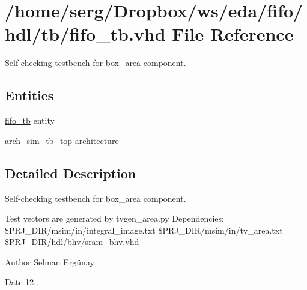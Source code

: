 \hypertarget{fifo__tb_8vhd}{}\section{/home/serg/\+Dropbox/ws/eda/fifo/hdl/tb/fifo\+\_\+tb.vhd File Reference}
\label{fifo__tb_8vhd}


Self-\/checking testbench for box\+\_\+area component.  


\subsection*{Entities}
\begin{DoxyCompactItemize}
\item 
\hyperlink{classfifo__tb}{fifo\+\_\+tb} entity
\item 
\hyperlink{classfifo__tb_1_1arch__sim__tb__top}{arch\+\_\+sim\+\_\+tb\+\_\+top} architecture
\end{DoxyCompactItemize}


\subsection{Detailed Description}
Self-\/checking testbench for box\+\_\+area component. 

Test vectors are generated by tvgen\+\_\+area.\+py Dependencies\+: \$\+P\+R\+J\+\_\+\+D\+IR/msim/in/integral\+\_\+image.txt \$\+P\+R\+J\+\_\+\+D\+IR/msim/in/tv\+\_\+area.txt \$\+P\+R\+J\+\_\+\+D\+IR/hdl/bhv/sram\+\_\+bhv.vhd \begin{DoxyAuthor}{Author}
Selman Ergünay 
\end{DoxyAuthor}
\begin{DoxyDate}{Date}
12.. 
\end{DoxyDate}
